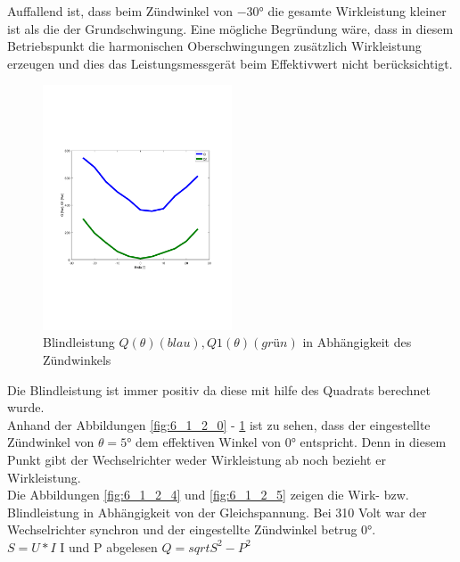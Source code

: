 Auffallend ist, dass beim Zündwinkel von $-30°$ die gesamte Wirkleistung kleiner ist als die der Grundschwingung. Eine mögliche Begründung wäre, dass in diesem Betriebspunkt die harmonischen Oberschwingungen zusätzlich Wirkleistung erzeugen und dies das Leistungsmessgerät beim Effektivwert nicht berücksichtigt.


\begin{figure}[H]
  \begin{center}
  \includegraphics[width=0.5\textwidth, trim={1cm 6.5cm 2cm 7cm},clip]{pic/6_1_grundfrequenztaktung/6_1_2_einst_wirk_und_blindleistung/Q_Q1.pdf}
  \caption{Blindleistung $Q(\theta) (blau), Q1(\theta) (grün)$ in Abhängigkeit des Zündwinkels}
  \label{fig:6_1_2_3}
  \end{center}
\end{figure}
Die Blindleistung ist immer positiv da diese mit hilfe des Quadrats berechnet wurde.\\
Anhand der Abbildungen \ref{fig:6_1_2_0} - \ref{fig:6_1_2_3} ist zu sehen, dass der eingestellte Zündwinkel von $\theta = 5°$ dem effektiven Winkel von $0°$ entspricht. Denn in diesem Punkt gibt der Wechselrichter weder Wirkleistung ab noch bezieht er Wirkleistung.\\

Die Abbildungen \ref{fig:6_1_2_4} und \ref{fig:6_1_2_5} zeigen die Wirk- bzw. Blindleistung in Abhängigkeit von der Gleichspannung. Bei 310 Volt war der Wechselrichter synchron und der eingestellte Zündwinkel betrug $0°$.\\

$S = U * I$
I und P abgelesen
$Q = sqrt{S^2 - P^2}$

